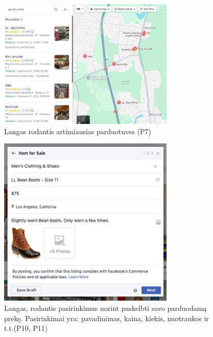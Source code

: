 \documentclass{article}
\begin{document}
	\begin{figure}[H]
		\includegraphics[width=0.75\textwidth]{./images/Picture4.png}
		\caption{Langas rodantis artimiausias parduotuves (P7)}
		\label{Pav:picture4}
	\end{figure}
	\begin{figure}[H]
		\includegraphics[width=0.75\textwidth]{./images/Picture5.png}
		\caption{Langas, rodantis pasirinkimus norint paskelbti savo parduodamą prekę. Pasirinkimai yra: pavadinimas, kaina, kiekis, nuotraukos ir t.t.(P10, P11)}
		\label{Pav:picture5}
	\end{figure}
\end{document}
